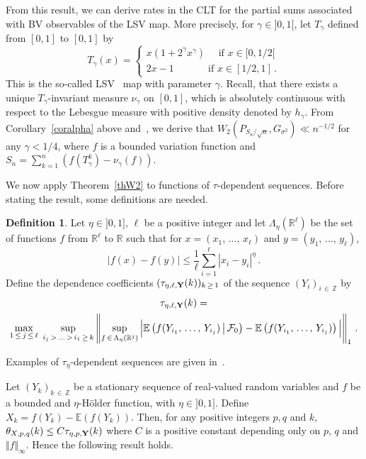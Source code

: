 \documentclass[10pt]{amsart}
\theoremstyle{definition}\newtheorem{defi}[theo]{Definition}\newtheorem{rema}[theo]{Remark}\newtheorem{exam}[theo]{Example}\newtheorem{exem}[theo]{Example}\newtheorem{nota}[theo]{Notation}
\newcommand{\bbE}{\mathbb{E}}
\newcommand{\bbZ}{\mathbb{Z}}
\newcommand{\clF}{\mathcal{F}}
\newcommand{\bbR}{\mathbb{R}}
\begin{document}
From this result, we can derive rates in the CLT for the partial sums associated with BV observables of the LSV map. More precisely, for $\gamma \in]0,1[$, let $T_\gamma$ defined from $[0,1]$ to $[0,1]$ by
\begin{equation*}
T_\gamma(x)=
\begin{cases}
x(1+ 2^{\gamma}x^{\gamma}) \quad \text{ if }x \in [0, 1/2[ \\
2x-1 \quad \quad \quad \ \ \text{if }x \in [1/2, 1] \,.
\end{cases}
\end{equation*}
This is the so-called LSV~\cite{LSV} map with parameter $\gamma$. Recall, that there exists a unique $T_\gamma$-invariant measure $\nu_\gamma$ on $[0, 1]$, which is absolutely continuous with respect to the Lebesgue measure with positive density denoted by $h_\gamma$. From Corollary~\ref{coralpha} above and~\cite[Prop.~1.17]{DGM10}, we derive that $ W_2 (P_{S_n / {\sqrt n} }, G_{\sigma^2}) \ll n^{-1/2}$ for any $\gamma < 1/4$, where $f$ is a bounded variation function and $S_n = \sum_{k=1}^n (f(T^k_{\gamma}) -\nu_\gamma (f))$.


We now apply Theorem~\ref{thW2} to functions of $\tau$-dependent sequences. Before stating the result, some definitions are needed.

\begin{defi}
Let $\eta \in]0, 1]$, $\ell$ be a positive integer and let $\Lambda_\eta(\bbR^\ell)$ be the set of functions $f$ from $\bbR^\ell$ to $\bbR$ such that for $x = (x_1,\,\dots,\,x_\ell)$ and $y = (y_1,\,\dots,\,y_\ell)$,
\[
\left|f(x)-f(y)\right|\leq \frac{1}{\ell} \sum_{i=1}^{\ell} |x_i-y_i|^{\eta} \,.
\]
Define the dependence coefficients $(\tau_{\eta, \ell,{\bf Y}} (k))_{k\, \geq\,1}$ of the sequence $(Y_i)_{i\,\in\,\bbZ}$ by
\begin{multline*}
\tau_{\eta,\ell,{\bf Y}} (k) =\\
\max_{1 \,\leq\,j\,\leq\,\ell}\; \sup_{i_j\,>\,\ldots\,>\,i_1\,\geq\,k} \left \| \sup_{f\,\in\,\Lambda_\eta(\bbR^j)}\Big |\bbE \left(f(Y_{i_1},\,\dots,\,Y_{i_j}) \,\middle|\,\clF_0\right)-\bbE\left(f(Y_{i_1}, \,\dots,\,Y_{i_j})\right)\Big | \right\|_1 \,.
\end{multline*}
\end{defi}

Examples of $\tau_\eta$-dependent sequences are given in~\cite{DP05}.


Let $(Y_k)_{k\,\in\,\bbZ}$ be a stationary sequence of real-valued random variables and $f$ be a bounded and $\eta$-H\"older function, with $\eta \in]0,1]$. Define $X_k = f(Y_k) - \bbE (f(Y_k))$. Then, for any positive integers $p,q$ and $k$, $\theta_{X, p,q } (k) \leq C \tau_{\eta, p,{\bf Y}} (k) $ where $C$ is a positive constant depending only on $p$, $q$ and $\Vert f \Vert_{\infty}$. Hence the following result holds.
\end{document}
